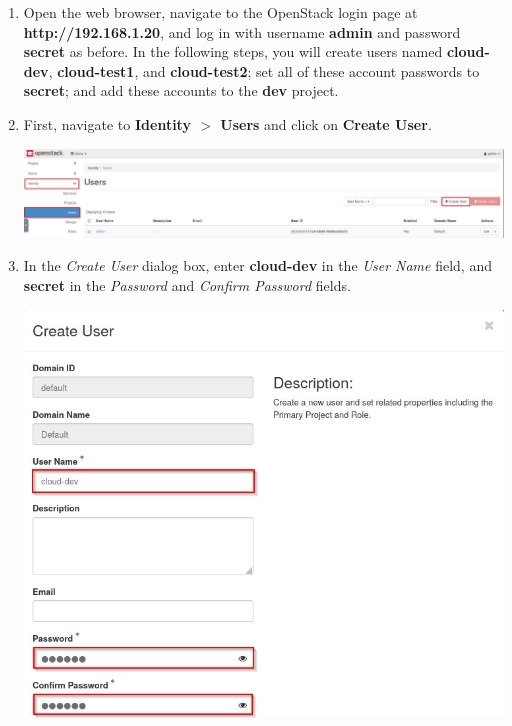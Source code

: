 \documentclass[letterpaper, 12pt]{article}
\begin{document}
\begin{enumerate}
    \item Open the web browser, navigate to the OpenStack login page at \textbf{http://192.168.1.20}, and log in with
    username \textbf{admin} and password \textbf{secret} as before. In the following steps, you will create users named
    \textbf{cloud-dev}, \textbf{cloud-test1}, and \textbf{cloud-test2}; set all of these account passwords to
    \textbf{secret}; and add these accounts to the \textbf{dev} project. 

    \item First, navigate to \textbf{Identity $>$ Users} and click on \textbf{Create User}.

    \begin{center}
        \includegraphics[width=\linewidth]{images/part3/step2.png}
    \end{center}
    
    \item In the \textit{Create User} dialog box, enter \textbf{cloud-dev} in the \textit{User Name} field, and
    \textbf{secret} in the \textit{Password} and \textit{Confirm Password} fields.

    \begin{center}
        \includegraphics[width=\linewidth]{images/part3/step3.png}
    \end{center}


\end{enumerate}
\end{document}

